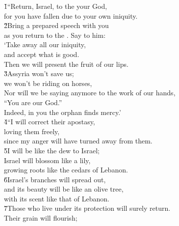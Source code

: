 \begin{poetry}
\poeml {}
\v{1}``Return, Israel, to the  your God, \\
\poemll    for you have fallen due to your own iniquity. \\
\poeml \v{2}Bring a prepared speech with you \\
\poemll    as you return to the . Say to him: \\
\poeml `Take away all our iniquity, \\
\poemll    and accept what is good. \\
\poeml Then we will present the fruit of our lips. \\
\poeml \v{3}Assyria won't save us; \\
\poemll    we won't be riding on horses, \\
\poeml Nor will we be saying anymore to the work of our hands, \\
\poemll    ``You are our God.'' \\
\poemlll       Indeed, in you the orphan finds mercy.' \\
\poeml \v{4}``I will correct their apostasy, \\
\poemll    loving them freely, \\
\poemlll       since my anger will have turned away from them. \\
\poeml \v{5}I will be like the dew to Israel; \\
\poemll    Israel will blossom like a lily, \\
\poemlll       growing roots like the cedars of Lebanon. \\
\poeml \v{6}Israel's branches will spread out, \\
\poemll    and its beauty will be like an olive tree, \\
\poemlll       with its scent like that of Lebanon. \\
\poeml \v{7}Those who live under its protection will surely return. \\
\poemll    Their grain will flourish; \\

\end{poetry}
